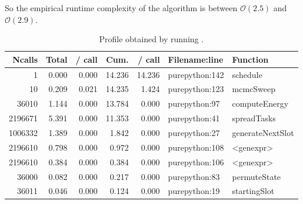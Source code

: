 So the empirical runtime complexity of the algorithm is between $\mathcal{O}(2.5)$ and $\mathcal{O}(2.9)$.

\begin{table}[H]
  \centering
  \caption{Profile obtained by running .}
  \begin{tabular}{rrrrrll}
    \hline
    \bf Ncalls & \bf Total & \bf / call & \bf Cum. & \bf / call & \bf Filename:line & \bf Function     \\
    \hline
    1          & 0.000     & 0.000      & 14.236   & 14.236     & purepython:142    & schedule         \\
    10         & 0.209     & 0.021      & 14.235   & 1.424      & purepython:123    & mcmcSweep        \\
    36010      & 1.144     & 0.000      & 13.784   & 0.000      & purepython:97     & computeEnergy    \\
    2196671    & 5.391     & 0.000      & 11.353   & 0.000      & purepython:41     & spreadTasks      \\
    1006332    & 1.389     & 0.000      & 1.842    & 0.000      & purepython:27     & generateNextSlot \\
    2196610    & 0.798     & 0.000      & 0.972    & 0.000      & purepython:108    & <genexpr>        \\
    2196610    & 0.384     & 0.000      & 0.384    & 0.000      & purepython:106    & <genexpr>        \\
    36000      & 0.082     & 0.000      & 0.217    & 0.000      & purepython:83     & permuteState     \\
    36011      & 0.046     & 0.000      & 0.124    & 0.000      & purepython:19     & startingSlot     \\
  \end{tabular}
  \label{table:profile}
\end{table}
